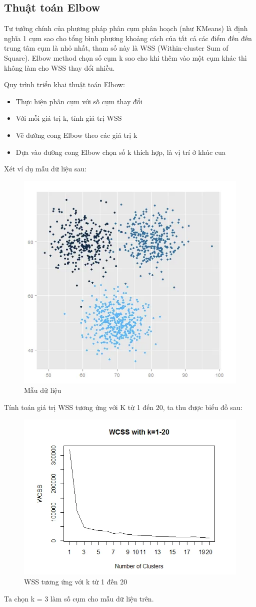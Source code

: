 \documentclass{article}
\begin{document}
\subsection{Thuật toán Elbow}
Tư tưởng chính của phương pháp phân cụm phân hoạch (như KMeans) là định nghĩa 1 cụm sao cho tổng bình phương khoảng cách của tất cả các điểm đến đến trung tâm cụm là nhỏ nhất, tham số này là WSS (Within-cluster Sum of Square). Elbow method chọn số cụm k sao cho khi thêm vào  một cụm khác thì không làm cho WSS thay đổi nhiều.\par
\newpage
Quy trình triển khai thuật toán Elbow:
\begin{itemize}
	\item Thực hiện phân cụm với số cụm thay đổi
	\item Với mỗi giá trị k, tính giá trị WSS
	\item Vẽ đường cong Elbow theo các giá trị k
	\item Dựa vào đường cong Elbow chọn số k thích hợp, là vị trí ở khúc cua 
\end{itemize}
Xét ví dụ mẫu dữ liệu sau:
\begin{figure}[h]
	\centering
	\includegraphics[width=0.5\linewidth]{img/data_set_1}
	\caption{Mẫu dữ liệu}
\end{figure}\par
Tính toán giá trị WSS tương ứng với K từ 1 đến 20, ta thu được biểu đồ sau:
\begin{figure}[h]
	\centering
	\includegraphics[width=0.6\linewidth]{img/data_set_2}
	\caption{WSS tương ứng với k từ 1 đến 20}
\end{figure}\par
Ta chọn k = 3 làm số cụm cho mẫu dữ liệu trên.
\newpage
\end{document}
